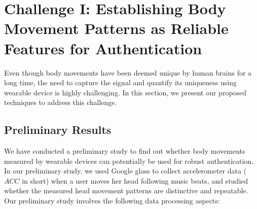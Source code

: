 \section{Challenge I: Establishing Body Movement Patterns as Reliable Features for Authentication}\label{sec:learning}

Even though body movements have been deemed unique by human brains for a long time, the need to capture the signal and quantify its uniqueness using wearable device is highly challenging. In this section, we present our proposed techniques to address this challenge.

\subsection{Preliminary Results}
We have conducted a preliminary study to find out whether body movements measured by wearable devices can potentially be used for robust authentication.
In our preliminary study, we used Google glass to collect accelerometer data ($ACC$ in short) when a user moves her head following music beats, and studied whether the measured head movement patterns are distinctive and repeatable. Our preliminary study involves the following data processing aspects:

